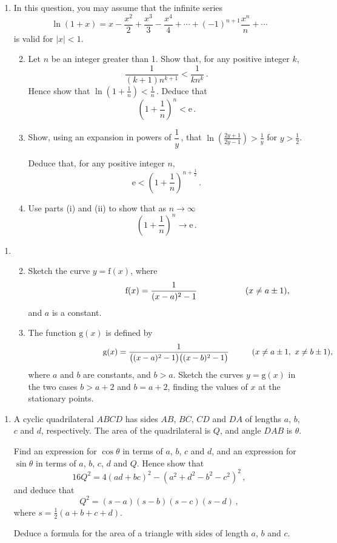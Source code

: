 \documentclass[a4, 11pt]{report}
\newlength{\qspace}
\newcounter{qnumber}
\newenvironment{question}%
 {\vspace{\qspace}
  \begin{enumerate}[\bfseries 1\quad][10]%
    \setcounter{enumi}{\value{qnumber}}%
    \item%
 }
{
  \end{enumerate}
  \filbreak
  \stepcounter{qnumber}
 }
\newenvironment{questionparts}[1][1]%
 {
  \begin{enumerate}[\bfseries (i)]%
    \setcounter{enumii}{#1}
    \addtocounter{enumii}{-1}
    \setlength{\itemsep}{5mm}
    \setlength{\parskip}{8pt}
 }
 {
  \end{enumerate}
 }
\def\e{{\mathrm e}}
\def\g{{\mathrm g}}
\def\f{{\mathrm f}}
\begin{document}
\begin{question}
In this question, you may assume that the infinite series 
\[
\ln(1+x) = x-\frac{x^2}2 + \frac{x^3}{3} -\frac {x^4}4 +\cdots
+ (-1)^{n+1} \frac {x^n}{n} + \cdots
\]
is valid for $\vert x \vert <1$.

\begin{questionparts}
\item
Let $n$ be an integer greater than 1. Show that, for any positive
integer $k$,
\[
\frac1{(k+1)n^{k+1}} 
<
\frac1{kn^{k}}\,.
\]
Hence show that $\displaystyle \ln\! \left(1+\frac1n\right) <\frac1n\,$. Deduce
that
\[
\left(1+\frac1n\right)^{\!n}<\e\,.
\]
\item
Show, using  an expansion in powers of $\dfrac1y\,$,  
that 
$ \displaystyle
 \ln \! \left(\frac{2y+1}{2y-1}\right) 
> \frac 1y
$ 
for $y>\frac12$. 

Deduce that, for any positive integer $n$, 
\[
\e < \left(1+\frac1n\right)^{\! n+\frac12}\,.
\] 
\item Use parts (i) and (ii) to show that as $n\to\infty$ 
\[
 \left(1+\frac1n\right)^{\!n}  
\to \e\,.
\]
\end{questionparts}
\end{question}

\begin{question}
\begin{questionparts}
\item Sketch the curve $y=\f(x)$, where
\[
\text{\hphantom{($x\e a\pm1$)}\hspace{2cm}}
\f(x) = \frac 1 {(x-a)^2 -1} 
\hspace{2cm}(x\ne a\pm1),
\]
and $a$ is a constant.

\item  The function $\g(x)$ is defined by
\[
\text{\hphantom{($x\e a\pm1, \ x\ne b\pm1$)}\hspace{1mm}}
\g(x) = \frac 1 {\big( (x-a)^2-1 \big) \big( (x-b)^2 -1\big)}
\hspace{1cm}(x\ne a\pm1, \ x\ne b\pm1),
\]
where $a$ and $b$ are constants, and $b>a$.
Sketch the curves $y=\g(x)$
in the two cases $b>a+2$ and $b=a+2$, finding the  
 values of $x$ at the stationary points.  

\end{questionparts}
	\end{question}
	
\begin{question}
A cyclic quadrilateral $ABCD$ has sides $AB$, $BC$, $CD$ and $DA$
of lengths $a$, $b$, $c$ and $d$, respectively. The area of the 
quadrilateral is $Q$, and   angle $DAB$ is $\theta$.

Find an expression for $\cos\theta$ in terms of $a$, $b$, $c$ and $d$,
and an expression 
for $\sin\theta$ in terms of  $a$, $b$, $c$, $d$ and $Q$.
Hence show  that
\[
16Q^2 = 4(ad+bc)^2 - (a^2+d^2-b^2-c^2)^2
\,,
\]
and deduce that 
\[
Q^2 = (s-a)(s-b)(s-c)(s-d)\,,
\]
where  $s= \frac12(a+b+c+d)$.

Deduce a formula for the area of a triangle with sides of length
$a$, $b$ and $c$.
\end{question}
	
\end{document}
